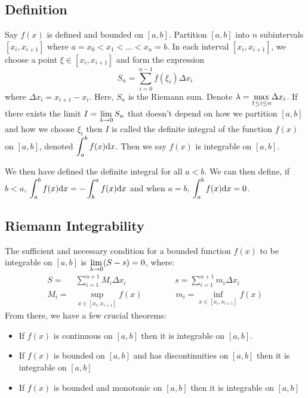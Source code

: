 \documentclass[12pt]{article}
\begin{document}
\subsection{Definition}
Say $f(x)$ is defined and bounded on $[a,b]$. Partition $[a,b]$ into $n$ subintervals $[x_i, x_{i+1}]$ where $a = x_0 < x_1 < \ldots < x_n = b$. In each interval $[x_i,x_{i+1}]$, we choose a point $\xi \in [x_i, x_{i+1}]$ and form the expression
\begin{equation*}
    S_n = \sum_{i=0}^{n-1}f(\xi_i) \Delta x_i
\end{equation*}
where $\Delta x_i = x_{i+1} - x_i$. Here, $S_n$ is the Riemann sum. Denote $\lambda = \mathlarger{\max_{1 \leq i \leq n}} \Delta x_i$. If there exists the limit $I = \mathlarger{\lim_{\lambda \rightarrow 0} S_n}$ that doesn't depend on how we partition $[a,b]$ and how we choose $\xi_i$ then $I$ is called the definite integral of the function $f(x)$ on $[a,b]$, denoted $\mathlarger{\int_a ^bf(x) \dd x}$. Then we say $f(x)$ is integrable on $[a,b]$.
\par We then have defined the definite integral for all $a<b$. We can then define, if $b<a$, $\mathlarger{\int_a ^bf(x) \dd x = - \int_b ^af(x) \dd x}$ and when $a = b$, $\mathlarger{\int_a ^bf(x) \dd x = 0}$.
\subsection{Riemann Integrability}
The sufficient and necessary condition for a bounded function $f(x)$ to be integrable on $[a,b]$ is $\mathlarger{\lim_{\lambda \rightarrow0}(S-s)=0}$, where:
\begin{align*}
    S = & \sum_{i=1}^{n+1} M_i \Delta x_i \quad \quad \quad \quad \quad \hspace{10pt} s = \sum_{i=1}^{n+1} m_i \Delta x_i \\
    M_i = & \sup_{x \in [x_i, x_{i+1}]} f(x) \quad \quad \quad \quad m_i =  \inf_{x \in [x_i, x_{i+1}]} f(x)
\end{align*}
From there, we have a few crucial theorems:
\begin{concept}
    \begin{itemize}
        \item If $f(x)$ is continuous on $[a,b]$ then it is integrable on $[a,b]$.
        \item If $f(x)$ is bounded on $[a,b]$ and has discontinuities on $[a,b]$ then it is integrable on $[a,b]$
        \item If $f(x)$ is bounded and monotonic on $[a,b]$ then it is integrable on $[a,b]$
    \end{itemize}
\end{concept}
\end{document}
